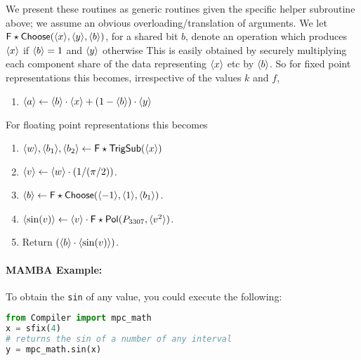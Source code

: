 We present these routines as generic routines given the specific helper subroutine above;
we assume an obvious overloading/translation of arguments.
We let $\mathsf{F\star Choose}(\langle x \rangle,\langle y \rangle,\langle b \rangle)$, for a 
shared bit $b$, denote an operation which produces $\langle x \rangle$ if $\langle b \rangle=1$ 
and $\langle y \rangle$ otherwise
This is easily obtained by securely multiplying each component share
of the data representing $\langle x \rangle$ etc by $\langle b \rangle$.
So for fixed point representations this becomes, irrespective of the
values $k$ and $f$,
\begin{enumerate}
\item $\langle a \rangle \leftarrow \langle b \rangle\cdot \langle x \rangle+(1-\langle b \rangle) \cdot \langle y \rangle$
\end{enumerate}
For floating point representations this becomes
\begin{enumerate}
\item $\langle w \rangle, \langle b_1 \rangle, \langle b_2 \rangle \leftarrow \mathsf{F\star TrigSub}(\langle x \rangle)$
\item $\langle v \rangle \leftarrow \langle w \rangle \cdot (1/(\pi/2))$.
\item $\langle b \rangle \leftarrow \mathsf{F\star Choose}(\langle -1 \rangle,\langle 1 \rangle, \langle b_1 \rangle)$.
\item $\langle \sin(v) \rangle \leftarrow \langle v \rangle \cdot \mathsf{F\star Pol}(P_{3307},\langle v^2 \rangle)$.
\item Return $(\langle b \rangle \cdot \langle \sin(v) \rangle)$.
\end{enumerate}
%

\paragraph{MAMBA Example:} To obtain the \verb|sin| of any value, you could execute the following:
\begin{lstlisting}[language={python}]
from Compiler import mpc_math
x = sfix(4)
# returns the sin of a number of any interval
y = mpc_math.sin(x)
\end{lstlisting}

